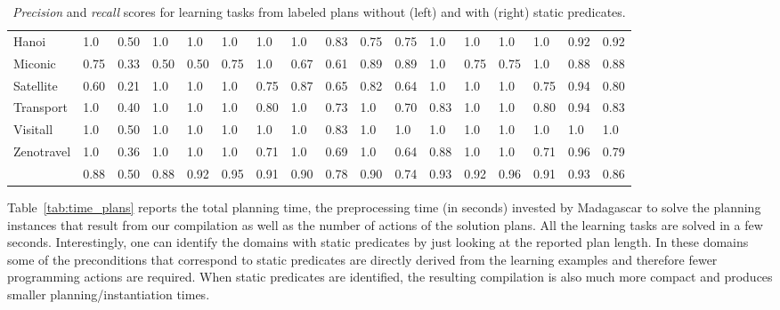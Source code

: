 \begin{table*}[hbt!]
{\begin{tabular}{l|l|l|l|l|l|l||l|l||l|l|l|l|l|l||l|l|}
			Hanoi & 1.0 & 0.50 & 1.0 & 1.0 & 1.0 & 1.0 & 1.0 & 0.83 & 0.75 & 0.75 & 1.0 & 1.0 & 1.0 & 1.0 & 0.92 & 0.92\\
			Miconic & 0.75 & 0.33 & 0.50 & 0.50 & 0.75 & 1.0 & 0.67 & 0.61 & 0.89 & 0.89 & 1.0 & 0.75 & 0.75 & 1.0 & 0.88 & 0.88\\
			Satellite & 0.60 & 0.21 & 1.0 & 1.0 & 1.0 & 0.75 & 0.87 & 0.65 & 0.82 & 0.64 & 1.0 & 1.0 & 1.0 & 0.75 & 0.94 & 0.80\\
			Transport & 1.0 & 0.40 & 1.0 & 1.0 & 1.0 & 0.80 & 1.0 & 0.73 & 1.0 & 0.70 & 0.83 & 1.0 & 1.0 & 0.80 & 0.94 & 0.83\\
			Visitall & 1.0 & 0.50 & 1.0 & 1.0 & 1.0 & 1.0 & 1.0 & 0.83 & 1.0 & 1.0 & 1.0 & 1.0 & 1.0 & 1.0 & 1.0 & 1.0\\
			Zenotravel & 1.0 & 0.36 & 1.0 & 1.0 & 1.0 & 0.71 & 1.0 & 0.69 &1.0 & 0.64 & 0.88 & 1.0 & 1.0 & 0.71 & 0.96 & 0.79\\
			\hline
			\bf  & 0.88 & 0.50 & 0.88 & 0.92 & 0.95 & 0.91 & 0.90 & 0.78 & 0.90 & 0.74 & 0.93 & 0.92 & 0.96 & 0.91 & 0.93 & 0.86\\
		\end{tabular}
	}
\caption{\small {\em Precision} and {\em recall} scores for learning tasks from labeled plans without (left) and with (right) static predicates.}
\label{tab:results_plans}
\end{table*}

Table~\ref{tab:time_plans} reports the total planning time, the preprocessing time (in seconds) invested by {\sc Madagascar} to solve the planning instances that result from our compilation as well as the number of actions of the solution plans. All the learning tasks are solved in a few seconds. Interestingly, one can identify the domains with static predicates by just looking at the reported plan length. In these domains some of the preconditions that correspond to static predicates are directly derived from the learning examples and therefore fewer programming actions are required. When static predicates are identified, the resulting compilation is also much more compact and produces smaller planning/instantiation times.



